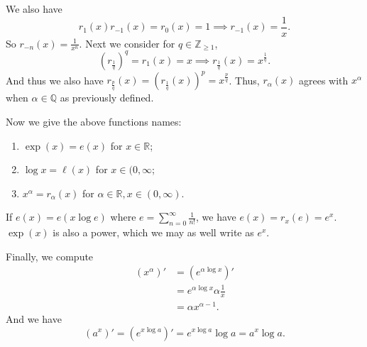 We also have
\[
    r_1(x)r_{-1}(x) = r_0(x) = 1 \implies r_{-1}(x) = \frac{1}{x}.
\]
So \(r_{-n}(x) = \frac{1}{x^n}\). Next we consider for \(q \in \mathbb{Z}_{\geq 1}\),
\[
    (r_{\frac{1}{q}})^q = r_1(x) = x \implies r_{\frac{1}{q}}(x) = x^{\frac{1}{q}}.
\]
And thus we also have \(r_{\frac{p}{q}}(x) = (r_{\frac{1}{q}}(x))^p = x^{\frac{p}{q}}\). Thus, \(r_\alpha(x)\) agrees with \(x^\alpha\) when \(\alpha\in \mathbb{Q}\) as previously defined.

Now we give the above functions names:
\begin{enumerate}
    \item \(\exp(x) = e(x)\) for \(x \in \mathbb{R}\);
    \item \(\log x = \ell(x)\) for \(x \in (0, \infty \);
    \item \(x^\alpha = r_\alpha(x)\) for \(\alpha \in \mathbb{R}, x \in (0, \infty)\).
\end{enumerate}
If \(e(x) = e(x \log e)\) where \(e = \sum\limits_{n=0}^{\infty} \frac{1}{n!}\), we have \(e(x) = r_x(e) = e^x\). \(\exp(x)\) is also a power, which we may as well write as \(e^x\).

Finally, we compute
\begin{align*}
    (x^\alpha)' &= (e^{\alpha \log x})'\\
    &= e^{\alpha \log x}\alpha\frac{1}{x}\\
    &= \alpha x^{\alpha - 1}.
\end{align*}
And we have
\[
    (a^x)' = (e^{x \log a})' = e^{x \log a} \log a = a^x \log a.
\]